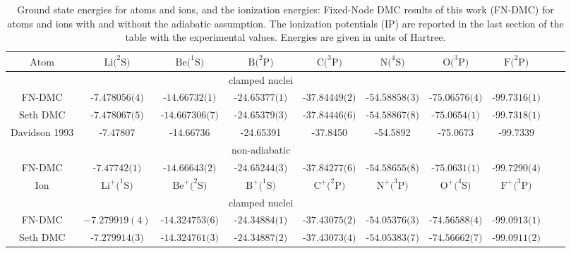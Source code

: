 \documentclass[pra,superscriptaddress,groupedaddress,twocolumn]{revtex4}
\begin{document}
\begin{table}[t!]
\setlength{\extrarowheight}{1pt}
\begin{threeparttable}
\caption{Ground state energies for atoms and ions, and the ionization energies: Fixed-Node DMC results of this work (FN-DMC) for atoms and ions with and without the adiabatic assumption. The ionization potentials (IP) are reported in the last section of the table with the experimental values. Energies are given in units of Hartree. \label{tab:ionization}}
\begin{tabular*}{\textwidth}{@{\extracolsep{\fill}} cccccccccc}
\hline\hline
$\text{Atom}$ & $\text{Li}(^2\text{S)}$ & $\text{Be}(^1\text{S)}$ & $\text{B}(^2\text{P)}$ & $\text{C}(^3\text{P)}$ & $\text{N}(^4\text{S)}$ & $\text{O}(^3\text{P)}$ & $\text{F}(^2\text{P)}$ \\ \hline
&&&clamped nuclei&&&& \\
FN-DMC & $\text{-7.478056(4)}$ & $\text{-14.66732(1)}$ & $\text{-24.65377(1)}$ & $\text{-37.84449(2)}$ & $\text{-54.58858(3)}$ & $\text{-75.06576(4)}$ & $\text{-99.7316(1)}$ \\
Seth DMC \cite{Seth_Bench} & $\text{-7.478067(5)}$ & $\text{-14.667306(7)}$ & $\text{-24.65379(3)}$ & $\text{-37.84446(6)}$ & $\text{-54.58867(8)}$ & $\text{-75.0654(1)}$ & $\text{-99.7318(1)}$ \\
Davidson 1993 \cite{Davidson_Atoms} &  -7.47807 & -14.66736 & -24.65391 & -37.8450 &-54.5892 & -75.0673 & -99.7339 \\
&&&non-adiabatic&&&& \\
FN-DMC & $\text{-7.47742(1)}$ & $\text{-14.66643(2)}$ & $\text{-24.65244(3)}$ & $\text{-37.84277(6)}$ & $\text{-54.58655(8)}$ & $\text{-75.0631(1)}$ & $\text{-99.7290(4)}$ \\
\hline
$\text{Ion}$ & $\text{Li}^+(^1\text{S)}$ & $\text{Be}^+(^2\text{S)}$ & $\text{B}^+(^1\text{S)}$ & $\text{C}^+(^2\text{P)}$ & $\text{N}^+(^3\text{P)}$ & $\text{O}^+(^4\text{S)}$ & $\text{F}^+(^3\text{P)}$ \\ \hline
&&&clamped nuclei&&&& \\
FN-DMC & $-7.279919(4)$ & $\text{-14.324753(6)}$ & $\text{-24.34884(1)}$ & $\text{-37.43075(2)}$ & $\text{-54.05376(3)}$ & $\text{-74.56588(4)}$ & $\text{-99.0913(1)}$ \\
Seth DMC \cite{Seth_Bench} & $\text{-7.279914(3)}$ & $\text{-14.324761(3)}$ & $\text{-24.34887(2)}$ & $\text{-37.43073(4)}$ & $\text{-54.05383(7)}$ & $\text{-74.56662(7)}$ & $\text{-99.0911(2)}$ \\

\end{tabular*}
\end{threeparttable}
\end{table}
\end{document}

